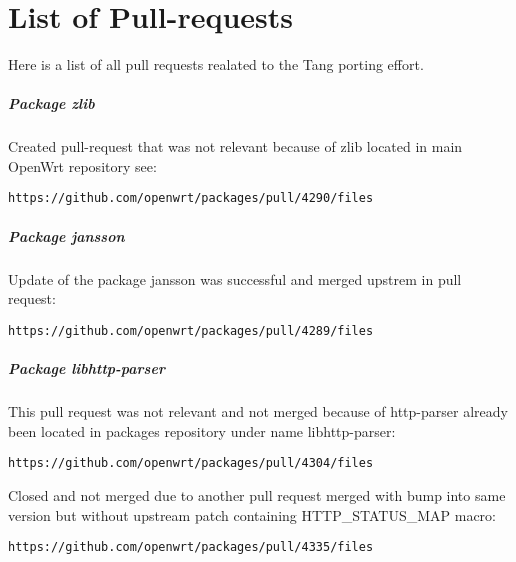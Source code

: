 \chapter{List of Pull-requests}\label{diffs}
Here is a list of all pull requests realated to the Tang porting effort.

\paragraph{Package zlib}

Created pull-request that was not relevant because of zlib located in main OpenWrt repository see:

\begin{lstlisting}[columns=fixed,basicstyle=\ttfamily\footnotesize,tabsize=4,backgroundcolor=\color{yellow!10}]
https://github.com/openwrt/packages/pull/4290/files
\end{lstlisting}

\paragraph{Package jansson}

Update of the package jansson was successful and merged upstrem in pull request:

\begin{lstlisting}[columns=fixed,basicstyle=\ttfamily\footnotesize,tabsize=4,backgroundcolor=\color{yellow!10}]
https://github.com/openwrt/packages/pull/4289/files
\end{lstlisting}

\paragraph{Package libhttp-parser}

This pull request was not relevant and not merged because of http-parser already been located in packages repository under name libhttp-parser:

\begin{lstlisting}[columns=fixed,basicstyle=\ttfamily\footnotesize,tabsize=4,backgroundcolor=\color{yellow!10}]
https://github.com/openwrt/packages/pull/4304/files
\end{lstlisting}

Closed and not merged due to another pull request merged with bump into same version but without upstream patch containing HTTP\_STATUS\_MAP macro:
\begin{lstlisting}[columns=fixed,basicstyle=\ttfamily\footnotesize,tabsize=4,backgroundcolor=\color{yellow!10}]
https://github.com/openwrt/packages/pull/4335/files
\end{lstlisting}

